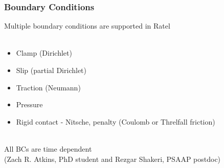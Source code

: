 \documentclass{beamer}
\begin{document}
\begin{frame}
\begin{center}
\frametitle{Boundary Conditions}

Multiple boundary conditions are supported in Ratel\\

~\\

\begin{itemize}

\item Clamp (Dirichlet)\\

\item Slip (partial Dirichlet)\\

\item Traction (Neumann)\\

\item Pressure\\

\item Rigid contact - Nitsche, penalty (Coulomb or Threlfall friction)\\

\end{itemize}

~\\

All BCs are time dependent\\


(Zach R. Atkins, PhD student and Rezgar Shakeri, PSAAP postdoc)

\end{center}
\end{frame}

\end{document}
